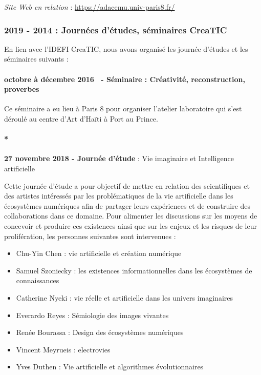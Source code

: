 \documentclass[
  a4paper,
  DIV=11,
  numbers=noendperiod]{scrreprt}
\let\oldparagraph\paragraph
\renewcommand{\paragraph}[1]{\oldparagraph{#1}\mbox{}}
\begin{document}
\emph{Site Web en relation} : \url{https://adacemu.univ-paris8.fr/}

\subsubsection{2019 - 2014 : Journées d'études, séminaires
CreaTIC}\label{journuxe9es-duxe9tudes-suxe9minaires-creatic}

En lien avec l'IDEFI CreaTIC, nous avons organisé les journée d'études
et les séminaires suivants :

\paragraph{octobre à décembre 2016 ~- Séminaire : Créativité,
reconstruction,
proverbes}\label{octobre-uxe0-duxe9cembre-2016---suxe9minaire-cruxe9ativituxe9-reconstruction-proverbes}

Ce séminaire a eu lieu à Paris 8 pour organiser l'atelier laboratoire
qui s'est déroulé au centre d'Art d'Haïti à Port au Prince.

\paragraph*{\texorpdfstring{\textbf{27 novembre 2018 - Journée d'étude}
: Vie imaginaire et Intelligence
artificielle}{27 novembre 2018 - Journée d'étude : Vie imaginaire et Intelligence artificielle}}\label{sec-seminaireVieArticielle}

Cette journée d'étude a pour objectif de mettre en relation des
scientifiques et des artistes intéressés par les problématiques de la
vie artificielle dans les écosystèmes numériques afin de partager leurs
expériences et de construire des collaborations dans ce domaine. Pour
alimenter les discussions sur les moyens de concevoir et produire ces
existences ainsi que sur les enjeux et les risques de leur
prolifération, les personnes suivantes sont intervenues :

\begin{itemize}
\item
  Chu-Yin Chen : vie artificielle et création numérique
\item
  Samuel Szoniecky : les existences informationnelles dans les
  écosystèmes de connaissances
\item
  Catherine Nyeki : vie réelle et artificielle dans les univers
  imaginaires
\item
  Everardo Reyes : Sémiologie des images vivantes
\item
  Renée Bourassa : Design des écosystèmes numériques
\item
  Vincent Meyrueis : electrovies
\item
  Yves Duthen : Vie artificielle et algorithmes évolutionnaires
\end{itemize}
\end{document}
